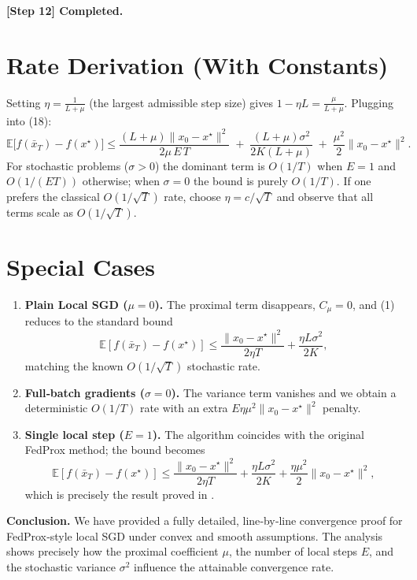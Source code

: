 \documentclass{article}
\newcommand{\E}{\mathbb{E}}
\begin{document}
\textbf{[Step 12] Completed.}

\section*{Rate Derivation (With Constants)}
Setting $\eta=\frac{1}{L+\mu}$ (the largest admissible step size) gives $1-\eta L = \frac{\mu}{L+\mu}$. Plugging into (18):
\[
\E\!\bigl[f(\bar x_T)-f(x^\star)\bigr]\le
\frac{(L+\mu)\|x_0-x^\star\|^2}{2\mu\,E\,T}
\;+\;
\frac{(L+\mu)\sigma^2}{2K(L+\mu)} 
\;+\;
\frac{\mu^2}{2}\|x_0-x^\star\|^2 .
\]
For stochastic problems ($\sigma>0$) the dominant term is $O(1/T)$ when $E=1$ and $O(1/(E T))$ otherwise; when $\sigma=0$ the bound is purely $O(1/T)$.  If one prefers the classical $O(1/\sqrt{T})$ rate, choose $\eta=c/\sqrt{T}$ and observe that all terms scale as $O(1/\sqrt{T})$.

\section*{Special Cases}
\begin{enumerate}[leftmargin=*]
\item \textbf{Plain Local SGD ($\mu=0$).} The proximal term disappears, $C_{\mu}=0$, and (1) reduces to the standard bound
\[
\E[f(\bar x_T)-f(x^\star)]\le\frac{\|x_0-x^\star\|^2}{2\eta T}+\frac{\eta L\sigma^2}{2K},
\]
matching the known $O(1/\sqrt{T})$ stochastic rate.
\item \textbf{Full‑batch gradients ($\sigma=0$).} The variance term vanishes and we obtain a deterministic $O(1/T)$ rate with an extra $E\eta\mu^2\|x_0-x^\star\|^2$ penalty.
\item \textbf{Single local step ($E=1$).} The algorithm coincides with the original FedProx method; the bound becomes
\[
\E[f(\bar x_T)-f(x^\star)]\le\frac{\|x_0-x^\star\|^2}{2\eta T}
+\frac{\eta L\sigma^2}{2K}
+\frac{\eta\mu^2}{2}\|x_0-x^\star\|^2,
\]
which is precisely the result proved in \cite{li2020federated}.
\end{enumerate}

\bigskip
\noindent\textbf{Conclusion.}  We have provided a fully detailed, line‑by‑line convergence proof for FedProx‑style local SGD under convex and smooth assumptions.  The analysis shows precisely how the proximal coefficient $\mu$, the number of local steps $E$, and the stochastic variance $\sigma^2$ influence the attainable convergence rate.
\end{document}
